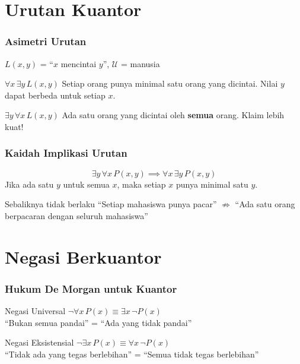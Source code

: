 \documentclass[handout]{beamer}
\theoremstyle{definition}
\theoremstyle{example}
\begin{document}
\section{Urutan Kuantor}

\begin{frame}
\frametitle{Asimetri Urutan}
$L(x,y)$ = ``$x$ mencintai $y$'', $\mathcal{U}$ = manusia
\begin{block}{$\forall x \, \exists y \, L(x,y)$}
Setiap orang punya minimal satu orang yang dicintai. Nilai $y$ dapat berbeda untuk setiap $x$.
\end{block}
\begin{block}{$\exists y \, \forall x \, L(x,y)$}
Ada satu orang yang dicintai oleh \textbf{semua} orang. Klaim lebih kuat!
\end{block}
\end{frame}

\begin{frame}
\frametitle{Kaidah Implikasi Urutan}
\[ \exists y \, \forall x \, P(x,y) \implies \forall x \, \exists y \, P(x,y) \]
Jika ada satu $y$ untuk semua $x$, maka setiap $x$ punya minimal satu $y$.

\begin{block}{Sebaliknya tidak berlaku}
``Setiap mahasiswa punya pacar'' $\not\Rightarrow$ ``Ada satu orang berpacaran dengan seluruh mahasiswa''
\end{block}
\end{frame}

\section{Negasi Berkuantor}

\begin{frame}
\frametitle{Hukum De Morgan untuk Kuantor}
\begin{block}{Negasi Universal}
$\neg \forall x \, P(x) \equiv \exists x \, \neg P(x)$\\
``Bukan semua pandai'' = ``Ada yang tidak pandai''
\end{block}
\begin{block}{Negasi Eksistensial}
$\neg \exists x \, P(x) \equiv \forall x \, \neg P(x)$\\
``Tidak ada yang tegas berlebihan'' = ``Semua tidak tegas berlebihan''
\end{block}
\end{frame}
\end{document}
